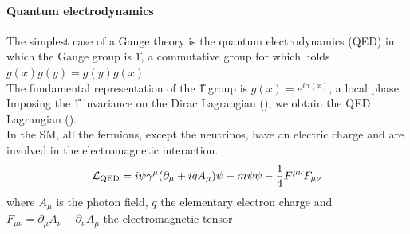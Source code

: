 \paragraph*{Quantum electrodynamics}
The simplest case of a Gauge theory is the quantum electrodynamics (QED) \cite{FeynmanQED:Matter} in which the Gauge group is \U{1}, a commutative group for which holds $g(x)g(y)=g(y)g(x)$\\
The fundamental representation of the \U{1} group is $g(x)=e^{i \alpha(x)}$, \ie a local phase.\\
Imposing the \U{1} invariance on the Dirac Lagrangian (), we obtain the QED Lagrangian ().\\
In the SM, all the fermions, except the neutrinos, have an electric charge and are involved in the electromagnetic interaction.
\begin{equation}\label{eq:QED}
    \mathcal{L}_\text{QED}=i\bar{\psi}\gamma^{\mu}(\partial_{\mu}+i q A_{\mu})\psi-m\bar{\psi}\psi-\frac{1}{4}F^{\mu\nu}F_{\mu\nu}
\end{equation}
where $A_\mu$ is the photon field, $q$ the elementary electron charge and $F_{\mu\nu}=\partial_\mu A_\nu-\partial_\nu A_\mu$ the electromagnetic tensor \\



